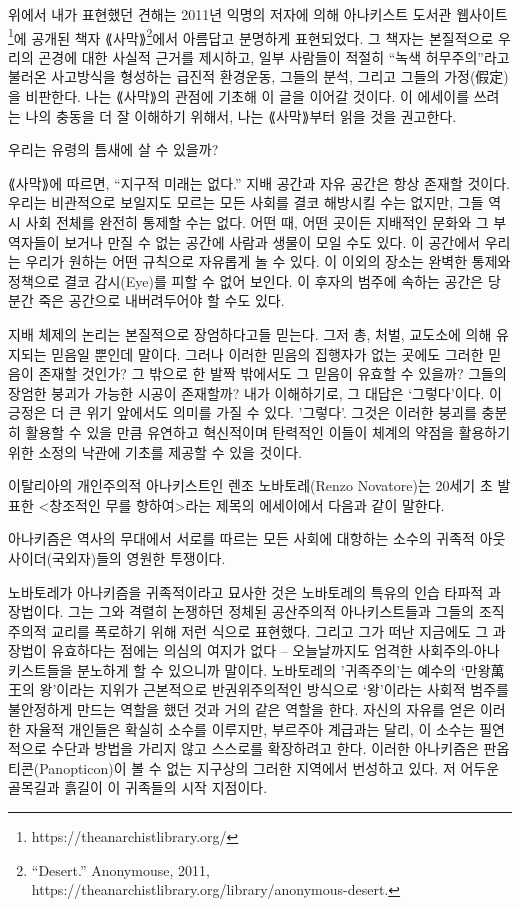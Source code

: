 \documentclass[11pt, b6paper, openany]{memoir}
\begin{document}
\begin{article}
위에서 내가 표현했던 견해는 2011년 익명의 저자에 의해 아나키스트 도서관 웹사이트\footnote{https://theanarchistlibrary.org/}에 공개된 책자 ⟪사막⟫\footnote{“Desert.” Anonymouse, 2011, https://theanarchistlibrary.org/library/anonymous-desert.}에서 아름답고 분명하게 표현되었다. 그 책자는 본질적으로 우리의 곤경에 대한 사실적 근거를 제시하고, 일부 사람들이 적절히 “녹색 허무주의”라고 불러온 사고방식을 형성하는 급진적 환경운동, 그들의 분석, 그리고 그들의 가정(假定)을 비판한다. 나는 ⟪사막⟫의 관점에 기초해 이 글을 이어갈 것이다. 이 에세이를 쓰려는 나의 충동을 더 잘 이해하기 위해서, 나는 ⟪사막⟫부터 읽을 것을 권고한다.

우리는 유령의 틈새에 살 수 있을까? 

⟪사막⟫에 따르면, “지구적 미래는 없다.” 지배 공간과 자유 공간은 항상 존재할 것이다. 우리는 비관적으로 보일지도 모르는 모든 사회를 결코 해방시킬 수는 없지만, 그들 역시 사회 전체를 완전히 통제할 수는 없다. 어떤 때, 어떤 곳이든 지배적인 문화와 그 부역자들이 보거나 만질 수 없는 공간에 사람과 생물이 모일 수도 있다. 이 공간에서 우리는 우리가 원하는 어떤 규칙으로 자유롭게 놀 수 있다. 이 이외의 장소는 완벽한 통제와 정책으로 결코 감시(Eye)를 피할 수 없어 보인다. 이 후자의 범주에 속하는 공간은 당분간 죽은 공간으로 내버려두어야 할 수도 있다. 

지배 체제의 논리는 본질적으로 장엄하다고들 믿는다. 그저 총, 처벌, 교도소에 의해 유지되는 믿음일 뿐인데 말이다. 그러나 이러한 믿음의 집행자가 없는 곳에도 그러한 믿음이 존재할 것인가? 그 밖으로 한 발짝 밖에서도 그 믿음이 유효할 수 있을까? 그들의 장엄한 붕괴가 가능한 시공이 존재할까? 내가 이해하기로, 그 대답은 ‘그렇다’이다. 이 긍정은 더 큰 위기 앞에서도 의미를 가질 수 있다. '그렇다'. 그것은 이러한 붕괴를 충분히 활용할 수 있을 만큼 유연하고 혁신적이며 탄력적인 이들이 체계의 약점을 활용하기 위한 소정의 낙관에 기초를 제공할 수 있을 것이다. 

이탈리아의 개인주의적 아나키스트인 렌조 노바토레(Renzo Novatore)는 20세기 초 발표한 <창조적인 무를 향하여>라는 제목의 에세이에서 다음과 같이 말한다.

    아나키즘은 역사의 무대에서 서로를 따르는 모든 사회에 대항하는 소수의 귀족적 아웃사이더(국외자)들의 영원한 투쟁이다.

노바토레가 아나키즘을 귀족적이라고 묘사한 것은 노바토레의 특유의 인습 타파적 과장법이다. 그는 그와 격렬히 논쟁하던 정체된 공산주의적 아나키스트들과 그들의 조직주의적 교리를 폭로하기 위해 저런 식으로 표현했다. 그리고 그가 떠난 지금에도 그 과장법이 유효하다는 점에는 의심의 여지가 없다 – 오늘날까지도 엄격한 사회주의-아나키스트들을 분노하게 할 수 있으니까 말이다. 노바토레의 '귀족주의'는 예수의 ‘만왕萬王의 왕’이라는 지위가 근본적으로 반권위주의적인 방식으로 ‘왕’이라는 사회적 범주를 불안정하게 만드는 역할을 했던 것과 거의 같은 역할을 한다. 자신의 자유를 얻은 이러한 자율적 개인들은 확실히 소수를 이루지만, 부르주아 계급과는 달리, 이 소수는 필연적으로 수단과 방법을 가리지 않고 스스로를 확장하려고 한다. 이러한 아나키즘은 판옵티콘(Panopticon)이 볼 수 없는 지구상의 그러한 지역에서 번성하고 있다. 저 어두운 골목길과 흙길이 이 귀족들의 시작 지점이다.


\end{article}
\end{document}
